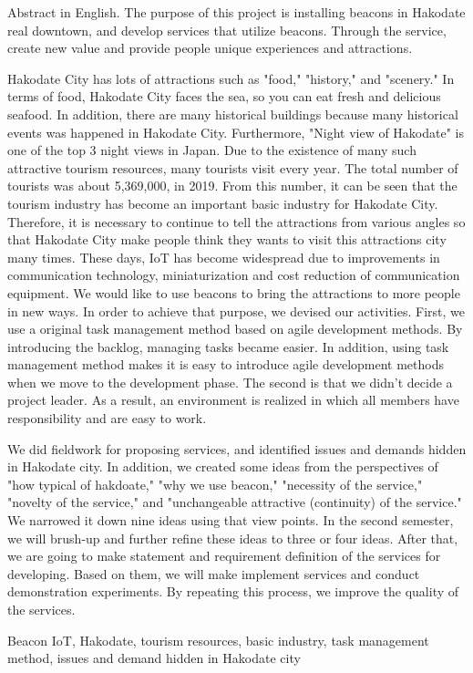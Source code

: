 \begin{eabstract} Abstract in English. 
The purpose of this project is installing beacons in Hakodate real downtown, and develop services that utilize beacons. Through the service, create new value and provide people unique experiences and attractions.

Hakodate City has lots of attractions such as "food," "history," and "scenery."
In terms of food, Hakodate City faces the sea, so you can eat fresh and delicious seafood.
In addition, there are many historical buildings because many historical events was happened in Hakodate City.
Furthermore, "Night view of Hakodate" is one of the top 3 night views in Japan.
Due to the existence of many such attractive tourism resources, many tourists visit every year.
The total number of tourists was about 5,369,000, in 2019.
From this number, it can be seen that the tourism industry has become an important basic industry for Hakodate City.
Therefore, it is necessary to continue to tell the attractions from various angles so that Hakodate City make people think they wants to visit this attractions city many times.
These days, IoT has become widespread due to improvements in communication technology, miniaturization and cost reduction of communication equipment.
We would like to use beacons to bring the attractions to more people in new ways.
In order to achieve that purpose, we devised our activities.
First, we use a original task management method based on agile development methods.
By introducing the backlog, managing tasks became easier.
In addition, using task management method makes it is easy to introduce agile development methods when we move to the development phase.
The second is that we didn't decide a project leader.
As a result, an environment is realized in which all members have responsibility and are easy to work.

We did fieldwork for proposing services, and identified issues and demands hidden in Hakodate city.
In addition, we created some ideas from the perspectives of "how typical of hakdoate," "why we use beacon," "necessity of the service," "novelty of the service," and "unchangeable attractive (continuity) of the service."
We narrowed it down nine ideas using that view points.
In the second semester, we will brush-up and further refine these ideas to three or four ideas.
After that, we are going to make statement and  requirement definition of the services for developing.
Based on them, we will make implement services and conduct demonstration experiments.
By repeating this process, we improve the quality of the services. 
\begin{ekeyword}
Beacon IoT, Hakodate, tourism resources, basic industry, task management method, issues and demand hidden in Hakodate city
\end{ekeyword}
\end{eabstract}
